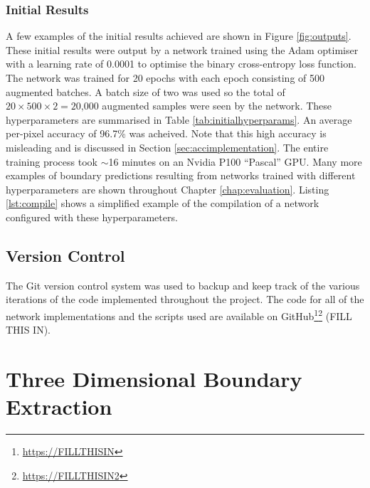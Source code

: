 \subsubsection{Initial Results}

A few examples of the initial results achieved are shown in Figure \ref{fig:outputs}. These initial results were output by a network trained using the Adam optimiser~\cite{adam} with a learning rate of 0.0001 to optimise the binary cross-entropy loss function. The network was trained for 20 epochs with each epoch consisting of 500 augmented batches. A batch size of two was used so the total of $20\times500\times2=\text{20,000}$ augmented samples were seen by the network. These hyperparameters are summarised in Table \ref{tab:initialhyperparams}. An average per-pixel accuracy of 96.7\% was acheived. Note that this high accuracy is misleading and is discussed in Section \ref{sec:accimplementation}. The entire training process took ${\sim}$16 minutes on an Nvidia P100 ``Pascal'' GPU. Many more examples of boundary predictions resulting from networks trained with different hyperparameters are shown throughout Chapter \ref{chap:evaluation}. Listing \ref{lst:compile} shows a simplified example of the compilation of a network configured with these hyperparameters.

\subsection{Version Control}

The Git version control system was used to backup and keep track of the various iterations of the code implemented throughout the project. The code for all of the network implementations and the scripts used are available on GitHub\footnote{\url{https://FILLTHISIN}}\footnote{\url{https://FILLTHISIN2}} (FILL THIS IN). 

\section{Three Dimensional Boundary Extraction}
\label{sec:threedimension}

